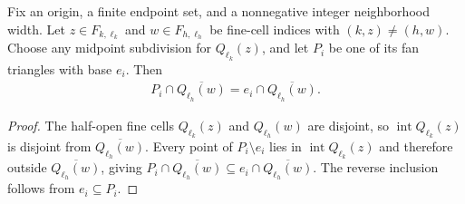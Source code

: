 \begin{lemma}
    \label{thm:area_law_fan_other_cell_contact}
    \leanok
    Fix an origin, a finite endpoint set, and a nonnegative integer
    neighborhood width. Let $z\in F_{k,\ell_k}$ and
    $w\in F_{h,\ell_h}$ be fine-cell indices with
    $(k,z)\ne(h,w)$. Choose any midpoint subdivision for $Q_{\ell_k}(z)$,
    and let $P_i$ be one of its fan triangles with base $e_i$. Then
    \begin{align}
        P_i\cap\overline{Q_{\ell_h}(w)}
        =e_i\cap\overline{Q_{\ell_h}(w)}.
    \end{align}
\end{lemma}
\begin{proof}\leanok
    The half-open fine cells $Q_{\ell_k}(z)$ and $Q_{\ell_h}(w)$ are disjoint,
    so $\operatorname{int}Q_{\ell_k}(z)$ is disjoint from
    $\overline{Q_{\ell_h}(w)}$. Every point of $P_i\setminus e_i$ lies in
    $\operatorname{int}Q_{\ell_k}(z)$ and therefore outside
    $\overline{Q_{\ell_h}(w)}$, giving
    $P_i\cap\overline{Q_{\ell_h}(w)}\subseteq e_i\cap\overline{Q_{\ell_h}(w)}$.
    The reverse inclusion follows from $e_i\subseteq P_i$.
\end{proof}
